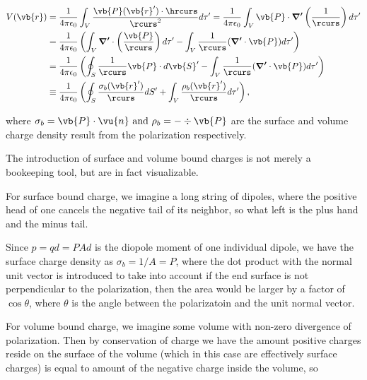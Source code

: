 \documentclass[english,a4paper,12pt]{report}
\begin{document}
\begin{equation}
    \begin{aligned} 
    V(\vb{r} ) &= \frac{1}{4\pi \epsilon_0} \int_{V}^{} \frac{\vb{P} (\vb{r} ')\cdot \hrcurs }{\rcurs ^2}d\tau ' = \frac{1}{4\pi \epsilon_0} \int_{V}^{} \vb{P} \cdot \boldsymbol{\nabla '}\left( \frac{1}{\rcurs }  \right) d\tau ' \\
    &= \frac{1}{4\pi \epsilon_0} \left( \int_{V}^{} \boldsymbol{\nabla '} \cdot \left( \frac{\vb{P} }{\rcurs }  \right) d\tau ' - \int_{V}^{} \frac{1}{\rcurs } (\boldsymbol{\nabla '} \cdot \vb{P}  ) d\tau ' \right) \\
    &= \frac{1}{4\pi \epsilon_0} \left( \oint_{S} \frac{1}{\rcurs }\vb{P} \cdot d\vb{S} '  - \int_{V}^{} \frac{1}{\rcurs } (\boldsymbol{\nabla '} \cdot \vb{P}  ) d\tau ' \right) \\
    &\equiv  \frac{1}{4\pi \epsilon_0} \left( \oint_{S} \frac{\sigma _{b}(\vb{r} ') }{\rcurs } dS' + \int_{V}^{} \frac{\rho _{b} (\vb{r} ')}{\rcurs } d\tau ' \right),
    \end{aligned} 
\end{equation}

where \(\sigma _{b} = \vb{P} \cdot \vu{n} \text { and } \rho _{b} = - \div{\vb{P} } \) are the surface and volume charge density result from the polarization respectively.

The introduction of surface and volume bound charges is not merely a bookeeping tool, but are in fact visualizable. 

For surface bound charge, we imagine a long string of dipoles, where the positive head of one cancels the negative tail of its neighbor, so what left is the plus hand and the minus tail.

Since \(p = qd = PAd\) is the diopole moment of one individual dipole, we have the surface charge density as \(\sigma _{b} = 1 /A = P\), where the dot product with the normal unit vector is introduced to take into account if the end surface is not perpendicular to the polarization, then the area would be larger by a factor of \(\cos \theta \), where \(\theta \) is the angle between the polarizatoin and the unit normal vector.

For volume bound charge, we imagine some volume with non-zero divergence of polarization. Then by conservation of charge we have the amount positive charges reside on the surface of the volume (which in this case are effectively surface charges) is equal to amount of the negative charge inside the volume, so
\end{document}
